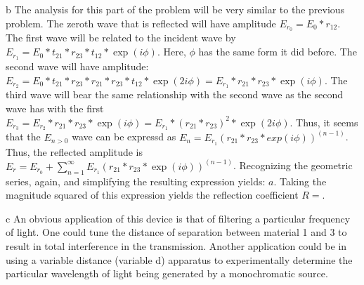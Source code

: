 \begin{homeworkProblem}
\begin{homeworkSection}{b}
The analysis for this part of the problem will be very similar to the previous problem. The zeroth wave that is reflected will have amplitude $E_{r_0} = E_0*r_{12}$. The first wave will be related to the incident wave by $E_{r_1} = E_0*t_{21}*r_{23}*t_{12}*\exp(i\phi)$. Here, $\phi$ has the same form it did before. The second wave will have amplitude: $E_{r_2} = E_0*t_{21}*r_{23}*r_{21}*r_{23}*t_{12}*\exp(2 i\phi) = E_{r_1} * r_{21}*r_{23}*\exp(i\phi)$. The third wave will bear the same relationship with the second wave as the second wave has with the first $E_{r_3} = E_{r_2} *r_{21} * r_{23}*\exp(i\phi) = E_{r_1} * (r_{21}*r_{23})^2*\exp(2i\phi)$. Thus, it seems that the $E_{n>0}$ wave can be expressd as $E_{n} = E_{r_1}(r_{21}*r_{23}*exp(i\phi))^(n-1)$.
\\
Thus, the reflected amplitude is $E_{r} = E_{r_0} + \sum\limits_{n=1}^\infty E_{r_1}(r_{21}*r_{23}*\exp(i\phi))^(n-1)$. Recognizing the geometric series, again, and simplifying the resulting expression yields: $a$. Taking the magnitude squared of this expression yields the reflection coefficient $R = $.
\end{homeworkSection}

\begin{homeworkSection}{c}
An obvious application of this device is that of filtering a particular frequency of light. One could tune the distance of separation between material 1 and 3 to result in total interference in the transmission. Another application could be in using a variable distance (variable d) apparatus to experimentally determine the particular wavelength of light being generated by a monochromatic source.
\end{homeworkSection}
\end{homeworkProblem}
